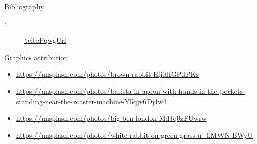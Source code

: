 
\begin{frame}{Bibliography}
  \begin{description}
    \item[\citePqwg:] \url{\citePqwgUrl}
  \end{description}
\end{frame}

\begin{frame}{Graphics attribution}
  \tiny
  \begin{itemize}
    \item \url{https://unsplash.com/photos/brown-rabbit-Efj0HGPdPKs}
    \item \url{https://unsplash.com/photos/barista-in-apron-with-hands-in-the-pockets-standing-near-the-roaster-machine-Y5qjv6Dj4w4}
    \item \url{https://unsplash.com/photos/big-ben-london-MdJq0zFUwrw}
    \item \url{https://unsplash.com/photos/white-rabbit-on-green-grass-u_kMWN-BWyU}
  \end{itemize}
\end{frame}
